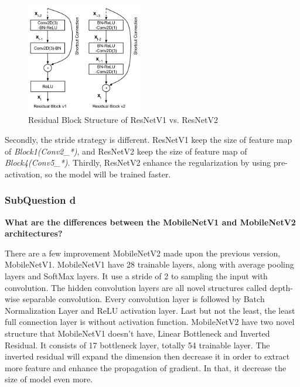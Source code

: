 \documentclass[conference]{IEEEtran}
\begin{document}
\begin{figure}[h] 
    \centering
    \includegraphics[width=0.45\textwidth]{./graphs/Task2/v1v2.png}
    \caption{Residual Block Structure of ResNetV1 vs. ResNetV2}
    \label{resv1v2}
\end{figure}

Secondly, the stride strategy is different. ResNetV1 keep the size of feature map of \textit{Block1(Conv2\_*)}, and ResNetV2 keep the size of feature map of \textit{Block4(Conv5\_*)}. Thirdly, ResNetV2 enhance the regularization by using pre-activation, so the model will be trained faster.

\subsubsection{SubQuestion d} \textbf{What are the differences between the MobileNetV1 and MobileNetV2 architectures?}

There are a few improvement MobileNetV2 made upon the previous version, MobileNetV1. MobileNetV1 have 28 trainable layers, along with average pooling layers and SoftMax layers. It use a stride of 2 to sampling the input with convolution. The hidden convolution layers are all novel structures called depth-wise separable convolution. Every convolution layer is followed by Batch Normalization Layer and ReLU activation layer. Last but not the least, the least full connection layer is without activation function.
MobileNetV2 have two novel structure that MobileNetV1 doesn't have, Linear Bottleneck and Inverted Residual. It consists of 17 bottleneck layer, totally 54 trainable layer. The inverted residual will expand the dimension then decrease it in order to extract more feature and enhance the propagation of gradient. In that, it decrease the size of model even more.
\end{document}
